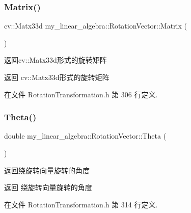 \subsubsection{\texorpdfstring{Matrix()}{Matrix()}}
{\footnotesize\ttfamily cv\+::\+Matx33d my\+\_\+linear\+\_\+algebra\+::\+Rotation\+Vector\+::\+Matrix (\begin{DoxyParamCaption}{ }\end{DoxyParamCaption})\hspace{0.3cm}{\ttfamily [inline]}}



返回cv\+::\+Matx33d形式的旋转矩阵 

\begin{DoxyReturn}{返回}
cv\+::\+Matx33d形式的旋转矩阵 
\end{DoxyReturn}


在文件 Rotation\+Transformation.\+h 第 306 行定义.

\mbox{\label{classmy__linear__algebra_1_1_rotation_vector_af732226d33a250f6bbe4fe54a1c1e577}} 
\subsubsection{\texorpdfstring{Theta()}{Theta()}}
{\footnotesize\ttfamily double my\+\_\+linear\+\_\+algebra\+::\+Rotation\+Vector\+::\+Theta (\begin{DoxyParamCaption}{ }\end{DoxyParamCaption})\hspace{0.3cm}{\ttfamily [inline]}}



返回绕旋转向量旋转的角度 

\begin{DoxyReturn}{返回}
绕旋转向量旋转的角度 
\end{DoxyReturn}


在文件 Rotation\+Transformation.\+h 第 314 行定义.

\mbox{\label{classmy__linear__algebra_1_1_rotation_vector_a75bc8e1b9365cbe8123eda8f7d0109c2}} 
